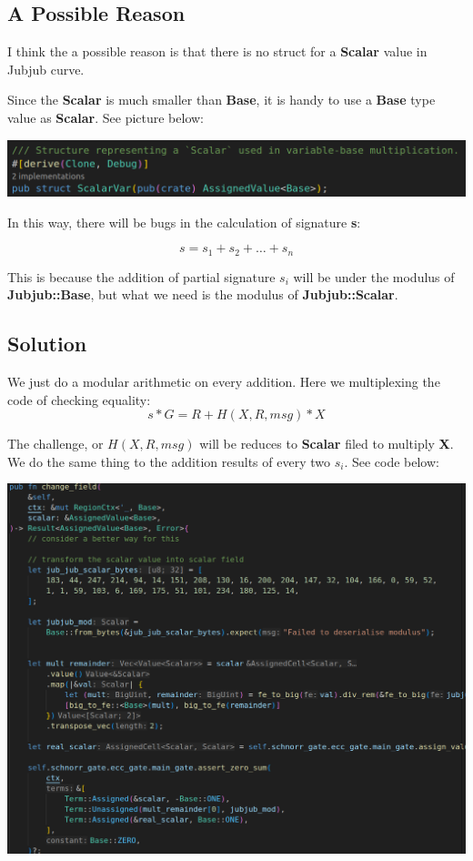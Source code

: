 \documentclass{article}
\begin{document}
\subsection{A Possible Reason}

I think the a possible reason is that there is no struct for a \textbf{Scalar} value in Jubjub curve.

Since the \textbf{Scalar} is much smaller than \textbf{Base}, it is handy to use a \textbf{Base} type value as \textbf{Scalar}. See picture below:

\includegraphics[width=1\linewidth]{scalarvar.png}

In this way, there will be bugs in the calculation of signature \textbf{s}:

\[
s = s_1 + s_2 + \ldots + s_n
\]

This is because the addition of partial signature \textbf{$s_i$} will be under the modulus of \textbf{Jubjub::Base}, but what we need is the modulus of \textbf{Jubjub::Scalar}.

\subsection{Solution}

We just do a modular arithmetic on every addition. Here we multiplexing the code of checking equality:
\[
s*G = R+H(X, R, msg)*X
\]

The challenge, or $H(X, R, msg)$ will be reduces to \textbf{Scalar} filed to multiply \textbf{X}. We do the same thing to the addition results of every two $s_i$. See code below:

\includegraphics[width=1\linewidth]{change_field.png}
\end{document}
